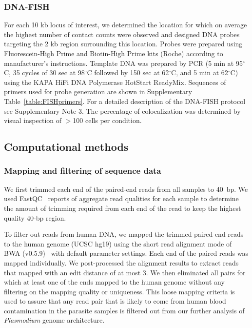 \subsubsection*{DNA-FISH}
For each 10 kb locus of interest, we determined the location for which on average
the highest number of contact counts were observed and designed DNA probes targeting
the 2 kb region surrounding this location. Probes were prepared using Fluorescein-High
Prime and Biotin-High Prime kits (Roche) according to manufacturer's instructions.
Template DNA was prepared by PCR (5 min at 95$^\circ$C, 35 cycles of 30 sec at
98$^\circ$C followed by 150 sec at 62$^\circ$C, and 5 min at 62$^\circ$C) using
the KAPA HiFi DNA Polymerase HotStart ReadyMix. Sequences of primers used for probe
generation are shown in Supplementary Table~\ref*{table:FISHprimers}. For a detailed
description of the DNA-FISH protocol see Supplementary Note 3. The percentage of
colocalization was determined by visual inspection of $>$100 cells per condition.

\subsection*{Computational methods}

\subsubsection*{Mapping and filtering of sequence data}
\label{met:mapping}
We first trimmed each end of the paired-end reads from all samples to 40~bp.
We used FastQC~\citep{andrews:fastqc}
reports of aggregate read qualities for each sample to determine the amount
of trimming required from each end of the read to keep the highest quality
$40$-bp region.

To filter out reads from human DNA, we mapped the trimmed paired-end reads to
the human genome (UCSC hg19) using the short read alignment mode of BWA (v0.5.9)~\citep{li:fast} 
with default parameter settings. Each end of the paired reads was mapped
individually. We post-processed the alignment results to extract reads that
mapped with an edit distance of at most 3. We then eliminated all pairs for
which at least one of the ends mapped to the human genome without any filtering
on the mapping quality or uniqueness. This loose mapping criteria is used to
assure that any read pair that is likely to come from human blood contamination
in the parasite samples is filtered out from our further analysis of
{\em Plasmodium} genome architecture.

